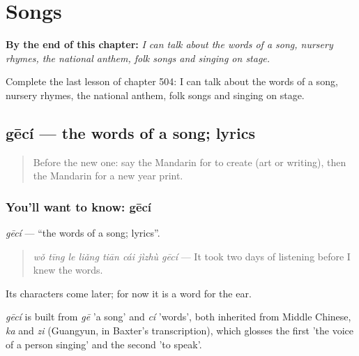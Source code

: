 
\chapter{Songs}
\label{ch:zh-songs}

\begin{chapteropening}
\textbf{By the end of this chapter:} \emph{I can talk about the words of a song, nursery rhymes, the national anthem, folk songs and singing on stage.}

Complete the last lesson of chapter 504: I can talk about the words of a song, nursery rhymes, the national anthem, folk songs and singing on stage.
\end{chapteropening}

\section[gēcí]{gēcí — the words of a song; lyrics}

\label{lesson:ZH-C504-geci}



\begin{quote}
Before the new one: say the Mandarin for to create (art or writing), then the Mandarin for a new year print.
\end{quote}

\subsection*{You'll want to know: gēcí}
\emph{gēcí} — \textquotedblleft{}the words of a song; lyrics\textquotedblright{}.

\begin{quote}
\emph{wǒ tīng le liǎng tiān cái jìzhù gēcí} — It took two days of listening before I knew the words.
\end{quote}

Its characters come later; for now it is a word for the ear.

\begin{cousinweb}
\emph{gēcí} is built from \emph{gē} 'a song' and \emph{cí} 'words', both inherited from Middle Chinese, \emph{ka} and \emph{zi} (Guangyun, in Baxter's transcription), which glosses the first 'the voice of a person singing' and the second 'to speak'.
\end{cousinweb}

